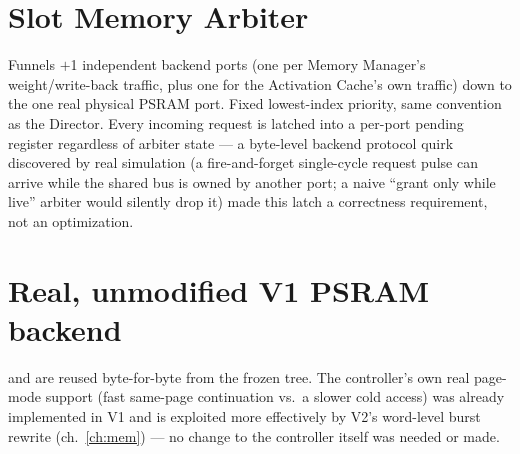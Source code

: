 \section{Slot Memory Arbiter}
Funnels $+$1 independent backend ports (one per Memory
Manager's weight/write-back traffic, plus one for the Activation
Cache's own traffic) down to the one real physical PSRAM port. Fixed
lowest-index priority, same convention as the Director. Every incoming
request is latched into a per-port pending register regardless of
arbiter state --- a byte-level backend protocol quirk discovered by real
simulation (a fire-and-forget single-cycle request pulse can arrive
while the shared bus is owned by another port; a naive ``grant only
while live'' arbiter would silently drop it) made this latch a
correctness requirement, not an optimization.

\section{Real, unmodified V1 PSRAM backend}
 and  are reused
byte-for-byte from the frozen  tree. The controller's
own real page-mode support (fast same-page continuation vs.\ a slower
cold access) was already implemented in V1 and is exploited more
effectively by V2's word-level burst rewrite (ch.~\ref{ch:mem}) --- no
change to the controller itself was needed or made.
